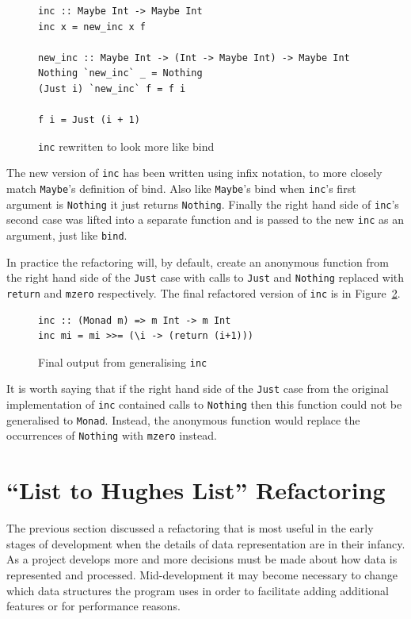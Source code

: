 \begin{figure}[t]
\begin{lstlisting}
inc :: Maybe Int -> Maybe Int
inc x = new_inc x f

new_inc :: Maybe Int -> (Int -> Maybe Int) -> Maybe Int
Nothing `new_inc` _ = Nothing
(Just i) `new_inc` f = f i

f i = Just (i + 1)
\end{lstlisting}
\caption{\texttt{inc} rewritten to look more like bind}
\label{incRewrite}
\end{figure}

The new version of \texttt{inc} has been written using infix notation, to more closely match \texttt{Maybe}'s definition of bind. Also like \texttt{Maybe}'s bind when \texttt{inc}'s first argument is \texttt{Nothing} it just returns \texttt{Nothing}. Finally the right hand side of \texttt{inc}'s second case was lifted into a separate function and is passed to the new \texttt{inc} as an argument, just like \texttt{bind}.

In practice the refactoring will, by default, create an anonymous function from the right hand side of the \texttt{Just} case with calls to \texttt{Just} and \texttt{Nothing} replaced with \texttt{return} and \texttt{mzero} respectively. The final refactored version of \texttt{inc} is in Figure~\ref{mmp1Ref}.

\begin{figure}[t]
\begin{lstlisting}
inc :: (Monad m) => m Int -> m Int
inc mi = mi >>= (\i -> (return (i+1)))
\end{lstlisting}
\caption{Final output from generalising \texttt{inc}}
\label{mmp1Ref}
\end{figure}

It is worth saying that if the right hand side of the \texttt{Just} case from the original implementation of \texttt{inc} contained calls to \texttt{Nothing} then this function could not be generalised to \texttt{Monad}. Instead, the anonymous function would replace the occurrences of \texttt{Nothing} with \texttt{mzero} instead.  
 
 
\section{``List to Hughes List'' Refactoring}\label{listToDlist}

The previous section discussed a refactoring that is most useful in the early stages of development when the details of data representation are in their infancy. As a project develops more and more decisions must be made about how data is represented and processed. Mid-development it may become necessary to change which data structures the program uses in order to facilitate adding additional features or for performance reasons.

